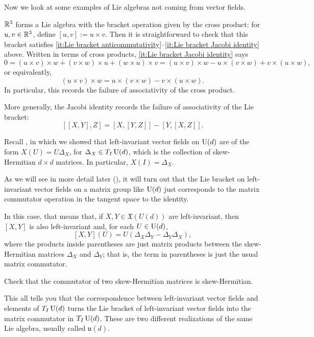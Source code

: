 Now we look at some examples of Lie algebras not coming from vector fields.

\begin{example}\label{ex:R^3 Lie algebra}
	$\mathbb{R}^3$ forms a Lie algebra with the bracket operation given by the cross product: for $u,v \in \mathbb{R}^3$, define $[u,v] := u \times v$. Then it is straightforward to check that this bracket satisfies \ref{it:Lie bracket anticommutativity}--\ref{it:Lie bracket Jacobi identity} above. Written in terms of cross products, \ref{it:Lie bracket Jacobi identity} says
	\[
		0 = (u \times v) \times w + (v \times w) \times u + (w \times u) \times v = (u \times v) \times w - u \times (v \times w) + v \times (u \times w),
	\]
	or equivalently,
	\[
		(u \times v) \times w = u \times (v \times w) - v \times (u \times w).
	\]
	In particular, this records the failure of associativity of the cross product.
\end{example}

More generally, the Jacobi identity records the failure of associativity of the Lie bracket:
\[
	[[X,Y],Z] = [X,[Y,Z]] - [Y,[X,Z]].
\]

\begin{example}\label{ex:Lie algebra U(d)}
	Recall , in which we showed that left-invariant vector fields on $\operatorname{U}(d)$ are of the form $X(U) = U \Delta_X$, for $\Delta_X \in T_I\operatorname{U}(d)$, which is the collection of skew-Hermitian $d \times d$ matrices. In particular, $X(I) = \Delta_X$.
	
	As we will see in more detail later (), it will turn out that the Lie bracket on left-invariant vector fields on a matrix group like $\operatorname{U}(d)$ just corresponds to the matrix commutator operation in the tangent space to the identity. 
	
	In this case, that means that, if $X,Y \in \mathfrak{X}(U(d))$ are left-invariant, then $[X,Y]$ is also left-invariant and, for each $U \in \operatorname{U}(d)$,
	\[
		[X,Y](U) = U(\Delta_X \Delta_Y - \Delta_Y \Delta_X),
	\]
	where the products inside parentheses are just matrix products between the skew-Hermitian matrices $\Delta_X$ and $\Delta_Y$; that is, the term in parentheses is just the usual matrix commutator.
	
	\begin{exercise}
		Check that the commutator of two skew-Hermitian matrices is skew-Hermitian.
	\end{exercise}
	
	This all tells you that the correspondence between left-invariant vector fields and elements of $T_I\operatorname{U}(d)$ turns the Lie bracket of left-invariant vector fields into the matrix commutator in $T_I \operatorname{U}(d)$. These are two different realizations of the same Lie algebra, usually called $\mathfrak{u}(d)$.
\end{example}

